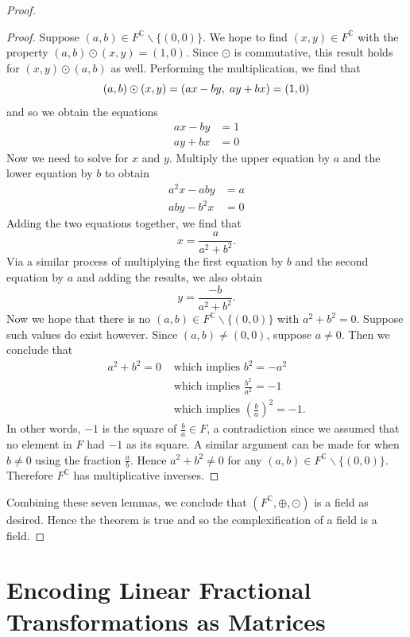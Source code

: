 \documentclass[12pt]{article}
\newcommand{\C}{\mathbb{C}}
\newcommand{\ttc}{, \hspace{1mm}}
\theoremstyle{plain}
\theoremstyle{definition}
\begin{document}
\begin{appendices}
\begin{proof}
\begin{proof}
Suppose $(a,b)\in F^\C\backslash\{(0,0)\}$. We hope to find $(x,y)\in F^\C$ with the property $(a,b)\odot(x,y) = (1,0)$. Since $\odot$ is commutative, this result holds for $(x,y)\odot(a,b)$ as well. Performing the multiplication, we find that
	\[
		(a,b)\odot(x,y) = (ax - by\ttc ay + bx) = (1,0)
	\]
	and so we obtain the equations
	\begin{align*}
		ax - by & = 1\\
		ay + bx & = 0
	\end{align*}
	Now we need to solve for $x$ and $y$. Multiply the upper equation by $a$ and the lower equation by $b$ to obtain
	\begin{align*}
		a^2x - aby & = a\\
		aby - b^2x & = 0
	\end{align*}
	Adding the two equations together, we find that
	\[
		x = \frac{a}{a^2 + b^2}.
	\]
	Via a similar process of multiplying the first equation by $b$ and the second equation by $a$ and adding the results, we also obtain
	\[
		y = \frac{-b}{a^2 + b^2}.
	\]
	Now we hope that there is no $(a,b)\in F^\C\backslash\{(0,0)\}$ with $a^2 + b^2 = 0$. Suppose such values do exist however. Since $(a,b)\neq (0,0)$, suppose $a\neq 0$. Then we conclude that
	\begin{align*}
		a^2 + b^2 = 0 & \text{ which implies } b^2 = -a^2\\
		& \text{ which implies } \frac{b^2}{a^2} = -1\\
		& \text{ which implies } \left(\frac{b}{a}\right)^2 = -1.
	\end{align*}
 	In other words, $-1$ is the square of $\frac{b}{a}\in F$, a contradiction since we assumed that no element in $F$ had $-1$ as its square. A similar argument can be made for when $b \neq 0$ using the fraction $\frac{a}{b}$. Hence $a^2 + b^2 \neq 0$ for any $(a,b)\in F^\C\backslash\{(0,0)\}$. Therefore $F^\C$ has multiplicative inverses.
\end{proof} 	
 	
Combining these seven lemmas, we conclude that $(F^\C,\oplus,\odot)$ is a field as desired. Hence the theorem is true and so the complexification of a field is a field. 

\end{proof}



\newpage 
\section{Encoding Linear Fractional Transformations as Matrices} \label{appendixC}


\end{appendices}
\end{document}
